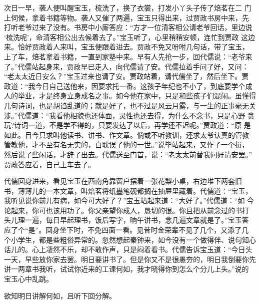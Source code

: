 次日一早，袭人便叫醒宝玉，梳洗了，换了衣裳，打发小丫头子传了焙茗在二
门上伺候，拿着书籍等物。袭人又催了两遍，宝玉只得出来，过贾政书房中来，先
打听老爷过来了没有。书房中小厮答应：“方才一位清客相公请老爷回话，里边说
‘梳洗呢’，命清客相公出去候着去了。”宝玉听了，心里稍稍安顿，连忙到贾政
这边来。恰好贾政着人来叫，宝玉便跟着进去。贾政不免又吩咐几句话，带了宝玉，
上了车，焙茗拿着书籍，一直到家塾中来。早有人先抢一步，回代儒说：“老爷来
了。”代儒站起身来，贾政早已走入，向代儒请了安。代儒拉着手问了好，又问：
“老太太近日安么？”宝玉过来也请了安。贾政站着，请代儒坐了，然后坐下。贾
政道：“我今日自己送他来，因要求托一番。这孩子年纪也不小了，到底要学个成
人的举业，才是终身立身成名之事。如今他在家中，只是和些孩子们混闹。虽懂得
几句诗词，也是胡诌乱道的；就是好了，也不过是风云月露，与一生的正事毫无关
涉。”代儒道：“我看他相貌也还体面，灵性也还去得，为什么不念书，只是心野
贪玩?诗词一道，不是学不得的，只要发达了以后，再学还不迟呢。”贾政道：“原
是如此。目今只求叫他读书、讲书、作文章。倘或不听教训，还求太爷认真的管教
管教他，才不至有名无实的，白耽误了他的一世。”说毕站起来，又作了一个揖，
然后说了些闲话，才辞了出去。代儒送至门首，说：“老太太前替我问好请安罢。”
贾政答应着，自己上车去了。

代儒回身进来，看见宝玉在西南角靠窗户摆着一张花梨小桌，右边堆下两套旧
书，薄薄儿的一本文章，叫焙茗将纸墨笔砚都搁在抽屉里藏着。代儒道：“宝玉，
我听见说你前儿有病，如今可大好了？”宝玉站起来道：“大好了。”代儒道：“如
今论起来，你可也该用功了。你父亲望你成人，恳切的很。你且把从前念过的书打
头儿理一遍，每日早起理书，饭后写字，晌午讲书，念几遍文章就是了。”宝玉答
应了个“是”。回身坐下时，不免四面一看。见昔时金荣辈不见了几个，又添了几
个小学生，都是些粗俗异常的。忽然想起秦钟来，如今没有一个做得伴、说句知心
话儿的。心上凄然不乐，却不敢作声，只是闷着看书。代儒告诉宝玉道：“今日头
一天，早些放你家去罢。明日要讲书了。但是你又不是很愚夯的，明日我倒要你先
讲一两章书我听，试试你近来的工课何如，我才晓得你到怎么个分儿上头。”说的
宝玉心中乱跳。

欲知明日讲解何如，且听下回分解。